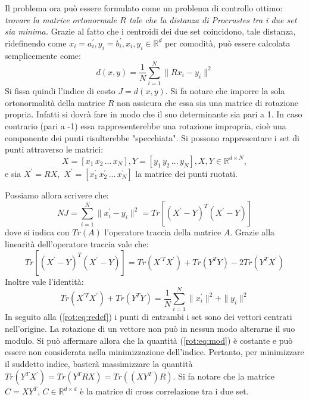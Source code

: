 Il problema ora può essere formulato come un problema di controllo ottimo: \textit{trovare la matrice ortonormale $R$ tale che la distanza di Procrustes tra i due set sia minima.} Grazie al fatto che i centroidi dei due set coincidono, tale distanza, ridefinendo come $x_i = a_i^{'}, y_i = b_i^{'}, x_i, y_i \in \mathbb{R}^d$ per comodità, può essere calcolata semplicemente come:
\begin{equation}
	\label{rot:eq:dist}
	d(x, y) =  \frac{1}{N}\sum_{i = 1}^{N} \| R x_i - y_i \|^2
\end{equation}
Si fissa quindi l'indice di costo $J = d(x, y)$. 
Si fa notare che imporre la sola ortonormalità della matrice $R$ non assicura che essa sia una matrice di rotazione propria. Infatti si dovrà fare in modo che il suo determinante sia pari a 1. In caso contrario (pari a -1) essa rappresenterebbe una rotazione impropria, cioè una componente dei punti risulterebbe "specchiata". 
Si possono rappresentare i set di punti attraverso le matrici:
\begin{equation}
	X = [x_1 \, x_2 \, ... \, x_N], Y = [y_1 \, y_2 \, ... \, y_N], X, Y \in \mathbb{R}^{d \times N},
\end{equation}
e sia $X^{'} = RX, \, \, X^{'} = [x_1^{'} \, x_2^{'} \, ... \, x_N^{'}]$ la matrice dei punti ruotati.

Possiamo allora scrivere che:
\begin{equation}
	N J = \sum_{i = 1}^{N} \| x_i^{'} - y_i \|^2 = Tr[(X^{'} - Y)^{T}(X^{'} - Y)]
\end{equation}
dove si indica con $Tr(A)$ l'operatore traccia della matrice $A$.
Grazie alla linearità dell'operatore traccia vale che:
\begin{equation}
Tr[(X^{'} - Y)^{T}(X^{'} - Y)] = Tr(X^{'T}X^{'}) + Tr(Y^{T}Y) - 2Tr(Y^{T}X^{'})
\end{equation}
Inoltre vale l'identità:
\begin{equation}
\label{rot:eq:mod}
Tr(X^{'T}X^{'}) + Tr(Y^{T}Y) = \frac{1}{N}\sum_{i = 1}^{N} \| x_i^{'} \| ^ 2 + \| y_i \| ^ 2
\end{equation}
In seguito alla (\ref{rot:eq:redef}) i punti di entrambi i set sono dei vettori centrati nell'origine. La rotazione di un vettore non può in nessun modo alterarne il suo modulo. Si può affermare allora che la quantità (\ref{rot:eq:mod}) è costante e può essere non considerata nella minimizzazione dell'indice. Pertanto, per minimizzare il suddetto indice, basterà massimizzare la quantità $Tr(Y^{T}X^{'}) = Tr(Y^{T}RX) = Tr((XY^{T})R)$.
Si fa notare che la matrice $ C = XY^{T}, \, C \in \mathbb{R}^{d \times d}$ è la matrice di cross correlazione tra i due set.

